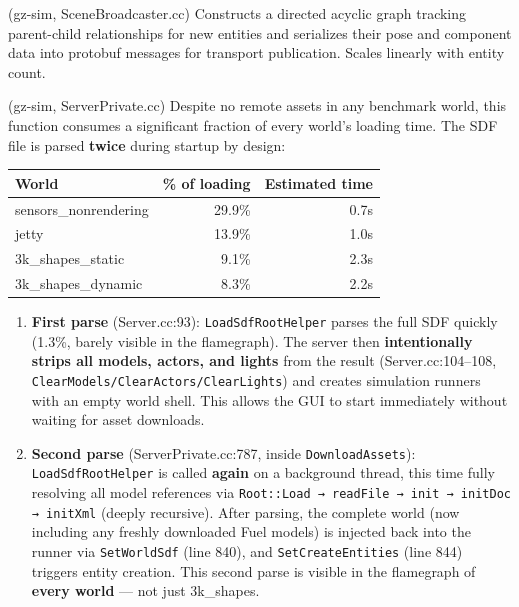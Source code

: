 \documentclass[11pt, a4paper]{article}
\begin{document}
\begin{description}[style=nextline, leftmargin=1.5cm]
\item[\texttt{SceneGraphAddEntities}] (gz-sim, SceneBroadcaster.cc) Constructs a directed acyclic graph tracking parent-child relationships for new entities and serializes their pose and component data into protobuf messages for transport publication. Scales linearly with entity count.
\item[\texttt{DownloadAssets}] (gz-sim, ServerPrivate.cc) Despite no remote assets in any benchmark world, this function consumes a significant fraction of every world's loading time. The SDF file is parsed \textbf{twice} during startup by design:

\begin{center}
\begin{tabular}{lrr}
\toprule
World & \% of loading & Estimated time \\
\midrule
sensors\_nonrendering & 29.9\% & 0.7s \\
jetty & 13.9\% & 1.0s \\
3k\_shapes\_static & 9.1\% & 2.3s \\
3k\_shapes\_dynamic & 8.3\% & 2.2s \\
\bottomrule
\end{tabular}
\end{center}

\begin{enumerate}
\item \textbf{First parse} (Server.cc:93): \texttt{LoadSdfRootHelper} parses the full SDF quickly (1.3\%, barely visible in the flamegraph). The server then \textbf{intentionally strips all models, actors, and lights} from the result (Server.cc:104--108, \texttt{ClearModels/ClearActors/ClearLights}) and creates simulation runners with an empty world shell. This allows the GUI to start immediately without waiting for asset downloads.
\item \textbf{Second parse} (ServerPrivate.cc:787, inside \texttt{DownloadAssets}): \texttt{LoadSdfRootHelper} is called \textbf{again} on a background thread, this time fully resolving all model references via \texttt{Root::Load → readFile → init → initDoc → initXml} (deeply recursive). After parsing, the complete world (now including any freshly downloaded Fuel models) is injected back into the runner via \texttt{SetWorldSdf} (line 840), and \texttt{SetCreateEntities} (line 844) triggers entity creation. This second parse is visible in the flamegraph of \textbf{every world} --- not just 3k\_shapes.
\end{enumerate}


\end{description}
\end{document}
